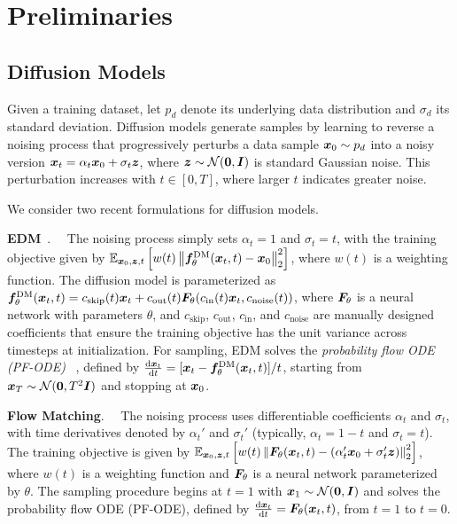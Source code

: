 \section{Preliminaries}

\subsection{Diffusion Models}

Given a training dataset, let $p_d$ denote its underlying data distribution and $\sigma_d$ its standard deviation. Diffusion models generate samples by learning to reverse a noising process that progressively perturbs a data sample ${\bm{x}}_0 \sim p_d$ into a noisy version ${\bm{x}}_t = \alpha_t {\bm{x}}_0 + \sigma_t {\bm{z}}$, where ${\bm{z}} \sim {\mathcal{N}}({\bm{0}}, {\bm{I}})$ is standard Gaussian noise. This perturbation increases with $t \in [0,T]$, where larger $t$ indicates greater noise.

We consider two recent formulations for diffusion models.

\textbf{EDM}~\citep{karras2022edm,karras2024edm2}.~~
The noising process simply sets $\alpha_t = 1$ and $\sigma_t = t$, with the training objective given by
$
\mathbb{E}_{{\bm{x}}_0,{\bm{z}},t}\left[
w(t) \left\| {\bm{f}}^{\text{DM}}_\theta({\bm{x}}_t,t) - {\bm{x}}_0 \right\|_2^2
\right]
$,
where $w(t)$ is a weighting function. The diffusion model is parameterized as ${\bm{f}}^{\text{DM}}_\theta({\bm{x}}_t,t) = c_{\text{skip}}(t){\bm{x}}_t + c_{\text{out}}(t){\bm{F}}_\theta(c_{\text{in}}(t){\bm{x}}_t, c_{\text{noise}}(t))$, where ${\bm{F}}_\theta$ is a neural network with parameters $\theta$, and $c_{\text{skip}}$, $c_{\text{out}}$, $c_{\text{in}}$, and $c_{\text{noise}}$ are manually designed coefficients that ensure the training objective has the unit variance across timesteps at initialization. For sampling, EDM solves the \textit{probability flow ODE (PF-ODE) }~\citep{song2020score}, defined by
$
\frac{\mathrm{d} {\bm{x}}_t}{\mathrm{d} t} = [{\bm{x}}_t - {\bm{f}}^{\text{DM}}_\theta({\bm{x}}_t,t)]/t
$, starting from ${\bm{x}}_T \sim {\mathcal{N}}({\bm{0}}, T^2 {\bm{I}})$ and stopping at ${\bm{x}}_0$.

\textbf{Flow Matching}.~~ 
The noising process uses differentiable coefficients $\alpha_t$ and $\sigma_t$, with time derivatives denoted by $\alpha_t'$ and $\sigma_t'$ (typically, $\alpha_t = 1 - t$ and $\sigma_t = t$). The training objective is given by
$
\mathbb{E}_{{\bm{x}}_0, {\bm{z}}, t} \left[ w(t) \left\| {\bm{F}}_\theta({\bm{x}}_t, t) - (\alpha_t' {\bm{x}}_0 + \sigma_t' {\bm{z}}) \right\|_2^2 \right]
$,
where $w(t)$ is a weighting function and ${\bm{F}}_\theta$ is a neural network parameterized by $\theta$. The sampling procedure begins at $t = 1$ with ${\bm{x}}_1 \sim {\mathcal{N}}({\bm{0}}, {\bm{I}})$ and solves the probability flow ODE (PF-ODE), defined by
$
\frac{\mathrm{d} {\bm{x}}_t}{\mathrm{d} t} = {\bm{F}}_\theta({\bm{x}}_t, t)
$,
from $t = 1$ to $t = 0$.





